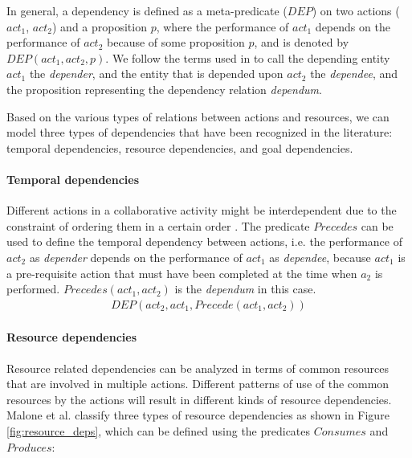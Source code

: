 In general, a dependency is defined as a meta-predicate ($DEP$) on two actions ($act_1$, $act_2$) and a proposition $p$, where the performance of $act_1$ depends on the performance of $act_2$ because of some proposition $p$, and is denoted by $DEP(act_1, act_2, p)$. We follow the terms used in \cite{yu1993actor} to call the depending entity $act_1$ the \emph{depender}, and the entity that is depended upon $act_2$ the \emph{dependee}, and the proposition representing the dependency relation \emph{dependum}.

Based on the various types of relations between actions and resources, we can model three types of dependencies that have been recognized in the literature: temporal dependencies, resource dependencies, and goal dependencies.

\paragraph*{Temporal dependencies} %
\label{par:temporal_dependencies}
Different actions in a collaborative activity might be interdependent due to the constraint of ordering them in a certain order \cite{sikora1998a}. The predicate $Precedes$ can be used to define the temporal dependency between actions, i.e. the performance of $act_2$ as \emph{depender} depends on the performance of $act_1$ as \emph{dependee}, because $act_1$ is a pre-requisite action that must have been completed at the time when $a_2$ is performed. $Precedes(act_1, act_2)$ is the \emph{dependum} in this case.
\begin{align*} 
	 DEP(act_2, act_1, Precede(act_1, act_2))
\end{align*}

\paragraph*{Resource dependencies} %
\label{par:resource_dependencies}
Resource related dependencies can be analyzed in terms of common resources that are involved in multiple actions. Different patterns of use of the common resources by the actions will result in different kinds of resource dependencies. Malone et al. \cite{malone1994interdisciplinary} classify three types of resource dependencies as shown in Figure \ref{fig:resource_deps}, which can be defined using the predicates $Consumes$ and $Produces$:

